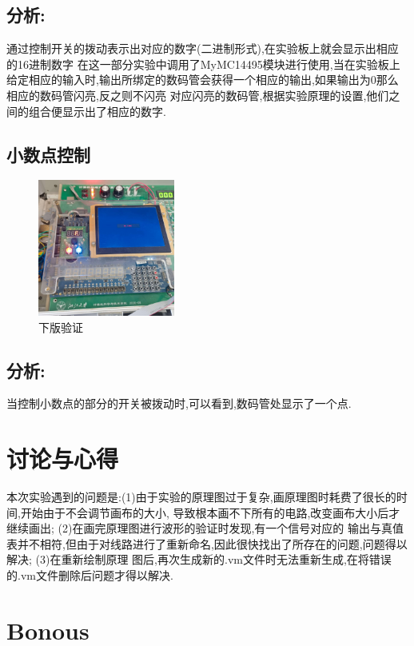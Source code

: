 \documentclass{article}
\begin{document}
\subsection*{分析:}
通过控制开关的拨动表示出对应的数字(二进制形式),在实验板上就会显示出相应的16进制数字
在这一部分实验中调用了MyMC14495模块进行使用,当在实验板上给定相应的输入时,输出所绑定的数码管会获得一个相应的输出,如果输出为0那么相应的数码管闪亮,反之则不闪亮
对应闪亮的数码管,根据实验原理的设置,他们之间的组合便显示出了相应的数字.

\subsection*{小数点控制}

    \begin{figure}[H]
    \centering
    \includegraphics[width=0.4\textwidth]{10.jpg}
    \caption{\label{Lab6}下版验证}
    \end{figure}
\subsection*{分析:}
当控制小数点的部分的开关被拨动时,可以看到,数码管处显示了一个点.


\section{讨论与心得}
本次实验遇到的问题是:(1)由于实验的原理图过于复杂,画原理图时耗费了很长的时间,开始由于不会调节画布的大小,
导致根本画不下所有的电路,改变画布大小后才继续画出; (2)在画完原理图进行波形的验证时发现,有一个信号对应的
输出与真值表并不相符,但由于对线路进行了重新命名,因此很快找出了所存在的问题,问题得以解决; (3)在重新绘制原理
图后,再次生成新的.vm文件时无法重新生成,在将错误的.vm文件删除后问题才得以解决.

\section{Bonous}
\end{document}
